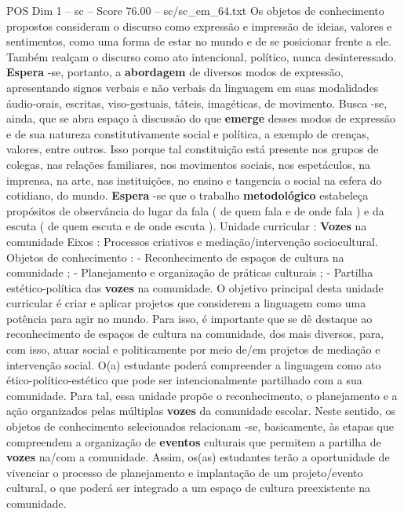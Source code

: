 \begin{textsample}{POS Dim 1 – sc – Score 76.00 – sc/sc\_em\_64.txt}
Os objetos de conhecimento propostos consideram o discurso como expressão e impressão de ideias, valores e sentimentos, como uma forma de estar no mundo e de se posicionar frente a ele.
Também realçam o discurso como ato intencional, político, nunca desinteressado. \textbf{Espera} -se, portanto, a \textbf{abordagem} de diversos modos de expressão, apresentando signos verbais e não verbais da linguagem em suas modalidades áudio-orais, escritas, viso-gestuais, táteis, imagéticas, de movimento.
Busca -se, ainda, que se abra espaço à discussão do que \textbf{emerge} desses modos de expressão e de sua natureza constitutivamente social e política, a exemplo de crenças, valores, entre outros.
Isso porque tal constituição está presente nos grupos de colegas, nas relações familiares, nos movimentos sociais, nos espetáculos, na imprensa, na arte, nas instituições, no ensino e tangencia o social na esfera do cotidiano, do mundo. \textbf{Espera} -se que o trabalho \textbf{metodológico} estabeleça propósitos de observância do lugar da fala ( de quem fala e de onde fala ) e da escuta ( de quem escuta e de onde escuta ).
Unidade curricular : \textbf{Vozes} na comunidade Eixos : Processos criativos e mediação/intervenção sociocultural.
Objetos de conhecimento : - Reconhecimento de espaços de cultura na comunidade ; - Planejamento e organização de práticas culturais ; - Partilha estético-política das \textbf{vozes} na comunidade.
O objetivo principal desta unidade curricular é criar e aplicar projetos que considerem a linguagem como uma potência para agir no mundo.
Para isso, é importante que se dê destaque ao reconhecimento de espaços de cultura na comunidade, dos mais diversos, para, com isso, atuar social e politicamente por meio de/em projetos de mediação e intervenção social.
O(a) estudante poderá compreender a linguagem como ato ético-político-estético que pode ser intencionalmente partilhado com a sua comunidade.
Para tal, essa unidade propõe o reconhecimento, o planejamento e a ação organizados pelas múltiplas \textbf{vozes} da comunidade escolar.
Neste sentido, os objetos de conhecimento selecionados relacionam -se, basicamente, às etapas que compreendem a organização de \textbf{eventos} culturais que permitem a partilha de \textbf{vozes} na/com a comunidade.
Assim, os(as) estudantes terão a oportunidade de vivenciar o processo de planejamento e implantação de um projeto/evento cultural, o que poderá ser integrado a um espaço de cultura preexistente na comunidade.

\end{textsample}
